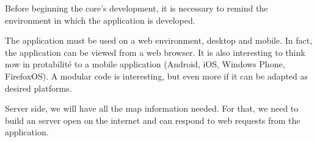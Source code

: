 



Before beginning the core's development, it is necessary to remind the environment in which the application is developed.

The application must be used on a web environment, desktop and mobile. In fact, the application can be viewed from a web browser. It is also interesting to think now in protabilité to a mobile application (Android, iOS, Windows Phone, FirefoxOS). A modular code is interesting, but even more if it can be adapted as desired platforms.

Server side, we will have all the map information needed. For that, we need to build an server open on the internet and can respond to web requests from the application.

